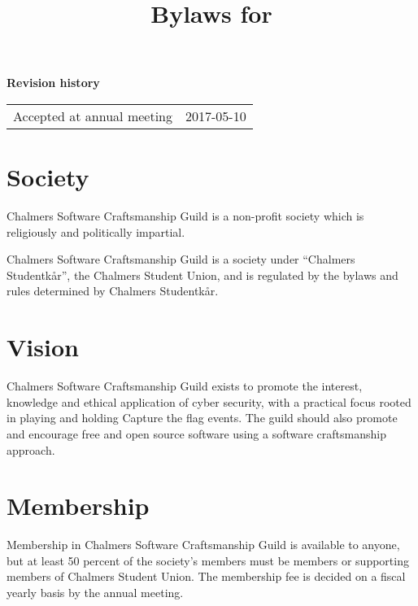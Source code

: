 \documentclass[a4paper]{article}
\author{}
\date{}
\title{\huge Bylaws for\\
    \huge \name}
\newcommand{\name}{Chalmers Software Craftsmanship Guild}
\begin{document}

\maketitle

\begin{center}
    \textbf{Revision history}\\
    \begin{tabu}{ll}
        Accepted at annual meeting  & 2017-05-10
    \end{tabu}
\end{center}



\section{Society}

\name{} is a non-profit society which is religiously and politically impartial.

\name{} is a society under ``Chalmers Studentkår'', the Chalmers Student Union,
and is regulated by the bylaws and rules determined by Chalmers Studentkår.

\section{Vision}
\label{sec:vision}

\name{} exists to promote the interest, knowledge and ethical application of
cyber security, with a practical focus rooted in playing and holding Capture
the flag events. The guild should also promote and encourage free and open
source software using a software craftsmanship approach.


\section{Membership}

Membership in \name{} is available to anyone, but at least 50 percent of the
society's members must be members or supporting members of Chalmers Student
Union. The membership fee is decided on a fiscal yearly basis by the annual
meeting.
\end{document}
